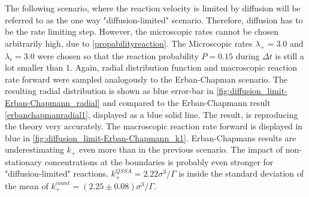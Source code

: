 \documentclass[
  a4paper,BCOR10mm,twoside,
  headsepline,footsepline,%
  fleqn,openbib
]{scrbook}
\begin{document}

The following scenario, where the reaction velocity is limited by diffusion will be referred to as the one way "diffusion-limited" scenario. Therefore, diffusion has to be the rate limiting step. However, the microscopic rates cannot be chosen arbitrarily high, due to \cref{propabilityreaction}. The Microscopic rates $\lambda_+=3.0$ and $\lambda_c=3.0$ were chosen so that the reaction probability $P=0.15$  during $\Delta t$ is still a lot smaller than 1. Again,  radial distribution function and macroscopic reaction rate forward were sampled analogously to the Erban-Chapman scenario. The resulting radial distribution is shown as blue error-bar in \cref{fig:diffusion_limit-Erban-Chapmann_radial} and compared to the Erban-Chapmann result \ref{erbanchapmanradial1}, displayed as a blue solid line. The result, is reproducing the theory very accurately. The macroscopic reaction rate forward is displayed in blue in \cref{fig:diffusion_limit-Erban-Chapmann_k1}. Erban-Chapmans results are underestimating  $k_+$ even more than in the previous scenario. The impact of non-stationary concentrations at the boundaries is probably even stronger for "diffusion-limited" reactions.  $k^{QSSA}_{+}=2.22 \sigma^3/\Gamma$ is inside the standard deviation of the mean of $k^{count}_{+}=(2.25\pm0.08)\sigma^3/\Gamma$.\par
\end{document}
